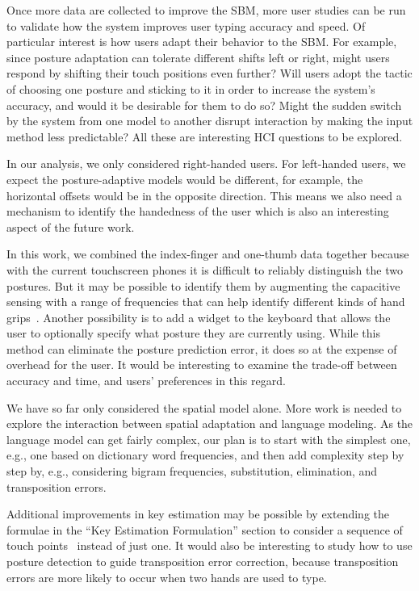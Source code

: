 \documentclass{sigchi}
\begin{document}
Once more data are collected to improve the SBM, more user studies can be run to validate how the system improves user typing
accuracy and speed. Of particular interest is how users
adapt their behavior to the SBM. For example, since posture adaptation
can tolerate different shifts left or right, might users respond by shifting their touch positions even further? Will users adopt the
tactic of choosing one posture and sticking to it in order to increase the system's
accuracy, and would it be desirable for them to do so? Might the sudden switch
by the system from one model to another disrupt interaction by making the input 
method less predictable? All these are interesting HCI questions to be explored.

In our analysis, we only considered right-handed users. For left-handed users,
we expect the posture-adaptive models would be different, for example, the
horizontal offsets would be in the opposite direction. This means we also
need a mechanism to identify the handedness of the user which is also an
interesting aspect of the future work.

In this work, we
combined the index-finger and one-thumb data together because with the current touchscreen phones it is difficult to reliably distinguish the two postures. But it may be possible to identify them by augmenting the
capacitive sensing with a range of frequencies that can help identify different kinds of 
hand grips~\cite{Sato:2012}. Another possibility is to add a widget to the
keyboard that allows the user to optionally specify what posture they are
currently using. While this method can eliminate the posture
prediction error, it does so at the expense of overhead for the user. It would be interesting
to examine the trade-off between accuracy and time,
and users' preferences in this regard.

We have so far only considered the spatial model alone. More work is needed
to explore the interaction between spatial adaptation and language modeling.
As the language model can get fairly complex, our plan is to start with the
simplest one, e.g., one based on dictionary word frequencies, and then add
complexity step by step by, e.g., considering bigram frequencies, substitution,
elimination, and transposition errors.

Additional improvements in key estimation may be possible by extending the formulae in the ``Key Estimation Formulation'' section to consider a
sequence of touch points~\cite{Goodman:2002, Gunawardana:2010} instead of just one.
It would also be interesting to study how to use posture detection to guide 
transposition error correction, because transposition errors are more likely to 
occur when two hands are used to type.
\end{document}
